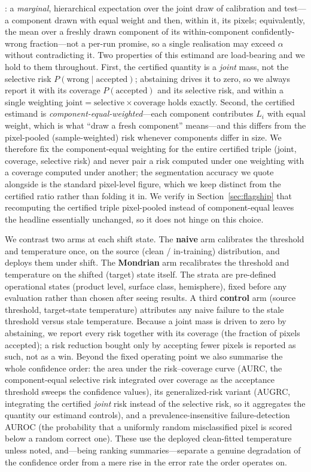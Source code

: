 \documentclass[preprint,3p,times]{elsarticle}
\begin{document}
\citep[Thm.~2.1]{angelopoulos2024}: a \emph{marginal}, hierarchical expectation over the joint draw of calibration and test---a component drawn with equal weight and then, within it, its pixels; equivalently, the mean over a freshly drawn component of its within-component confidently-wrong fraction---not a per-run promise, so a single realisation may exceed $\alpha$ without contradicting it. Two properties of this estimand are load-bearing and we hold to them throughout. First, the certified quantity is a \emph{joint} mass, not the selective risk $P(\text{wrong} \mid \text{accepted})$; abstaining drives it to zero, so we always report it with its coverage $P(\text{accepted})$ and its selective risk, and within a single weighting $\text{joint} = \text{selective} \times \text{coverage}$ holds exactly. Second, the certified estimand is \emph{component-equal-weighted}---each component contributes $L_i$ with equal weight, which is what ``draw a fresh component'' means---and this differs from the pixel-pooled (sample-weighted) risk whenever components differ in size. We therefore fix the component-equal weighting for the entire certified triple (joint, coverage, selective risk) and never pair a risk computed under one weighting with a coverage computed under another; the segmentation accuracy we quote alongside is the standard pixel-level figure, which we keep distinct from the certified ratio rather than folding it in. We verify in Section~\ref{sec:flagship} that recomputing the certified triple pixel-pooled instead of component-equal leaves the headline essentially unchanged, so it does not hinge on this choice.

We contrast two arms at each shift state. The \textbf{naive} arm calibrates the threshold and temperature once, on the source (clean / in-training) distribution, and deploys them under shift. The \textbf{Mondrian} arm recalibrates the threshold and temperature on the shifted (target) state itself. The strata are pre-defined operational states (product level, surface class, hemisphere), fixed before any evaluation rather than chosen after seeing results. A third \textbf{control} arm (source threshold, target-state temperature) attributes any naive failure to the stale threshold versus stale temperature. Because a joint mass is driven to zero by abstaining, we report every risk together with its coverage (the fraction of pixels accepted); a risk reduction bought only by accepting fewer pixels is reported as such, not as a win. Beyond the fixed operating point we also summarise the whole confidence order: the area under the risk--coverage curve (AURC, the component-equal selective risk integrated over coverage as the acceptance threshold sweeps the confidence values), its generalized-risk variant (AUGRC, integrating the certified \emph{joint} risk instead of the selective risk, so it aggregates the quantity our estimand controls), and a prevalence-insensitive failure-detection AUROC (the probability that a uniformly random misclassified pixel is scored below a random correct one). These use the deployed clean-fitted temperature unless noted, and---being ranking summaries---separate a genuine degradation of the confidence order from a mere rise in the error rate the order operates on.
\end{document}
